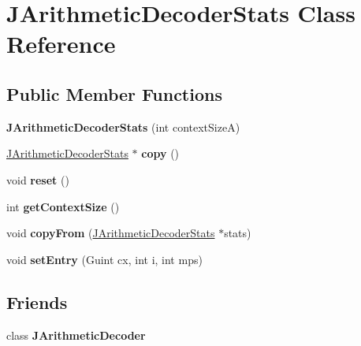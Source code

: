 \hypertarget{class_j_arithmetic_decoder_stats}{}\section{J\+Arithmetic\+Decoder\+Stats Class Reference}
\label{class_j_arithmetic_decoder_stats}
\subsection*{Public Member Functions}
\begin{DoxyCompactItemize}
\item 
\mbox{\label{class_j_arithmetic_decoder_stats_aede46e2e6c2e7dfe61a907416c028d6c}} 
{\bfseries J\+Arithmetic\+Decoder\+Stats} (int context\+SizeA)
\item 
\mbox{\label{class_j_arithmetic_decoder_stats_a34d0a3dfd209c4e62cc5548c40818937}} 
\hyperlink{class_j_arithmetic_decoder_stats}{J\+Arithmetic\+Decoder\+Stats} $\ast$ {\bfseries copy} ()
\item 
\mbox{\label{class_j_arithmetic_decoder_stats_a173b11b2613239b6b9b0785d50c43485}} 
void {\bfseries reset} ()
\item 
\mbox{\label{class_j_arithmetic_decoder_stats_ac621b19efeb29e8666ef5117a30147d2}} 
int {\bfseries get\+Context\+Size} ()
\item 
\mbox{\label{class_j_arithmetic_decoder_stats_a0b9c3e43b82f1896bb1e85add3dfdbfa}} 
void {\bfseries copy\+From} (\hyperlink{class_j_arithmetic_decoder_stats}{J\+Arithmetic\+Decoder\+Stats} $\ast$stats)
\item 
\mbox{\label{class_j_arithmetic_decoder_stats_a2fe12d8d2129e6a39527742b0a7d41d7}} 
void {\bfseries set\+Entry} (Guint cx, int i, int mps)
\end{DoxyCompactItemize}
\subsection*{Friends}
\begin{DoxyCompactItemize}
\item 
\mbox{\label{class_j_arithmetic_decoder_stats_adbf6a6b051436947a912a55bbbf0d26e}} 
class {\bfseries J\+Arithmetic\+Decoder}
\end{DoxyCompactItemize}



